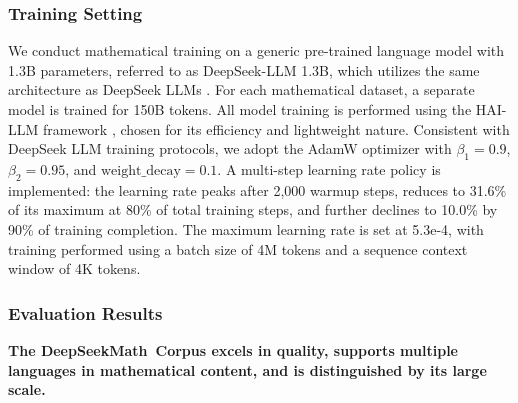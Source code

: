 \subsubsection{Training Setting}
\label{sec:quality-policy}
We conduct mathematical training on a generic pre-trained language model with 1.3B parameters, referred to as DeepSeek-LLM 1.3B, which utilizes the same architecture as DeepSeek LLMs \citep{deepseek-llm}. For each mathematical dataset, a separate model is trained for 150B tokens. All model training is performed using the HAI-LLM framework \citep{haillm}, chosen for its efficiency and lightweight nature. Consistent with DeepSeek LLM training protocols, we adopt the AdamW optimizer \citep{adamW} with $\beta_1=0.9$, $\beta_2=0.95$, and $\mathrm{weight\_decay}=0.1$. A multi-step learning rate policy is implemented: the learning rate peaks after 2,000 warmup steps, reduces to 31.6\% of its maximum at 80\% of total training steps, and further declines to 10.0\% by 90\% of training completion. The maximum learning rate is set at 5.3e-4, with training performed using a batch size of 4M tokens and a sequence context window of 4K tokens.

\subsubsection{Evaluation Results}

\textbf{The DeepSeekMath~Corpus excels in quality, supports multiple languages in mathematical content, and is distinguished by its large scale.}

